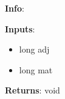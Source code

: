 \textbf{Info}:

\noindent \textbf{Inputs}:
\begin{itemize}
\item{long adj}
\item{long mat}
\end{itemize}

\noindent \textbf{Returns}: void
